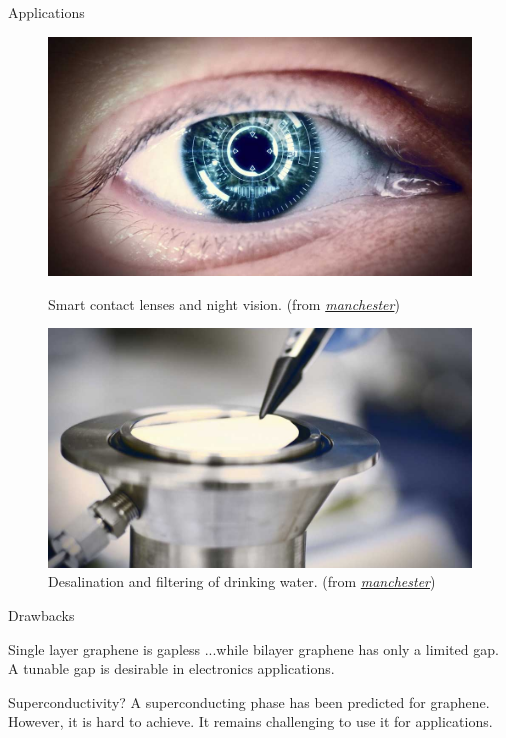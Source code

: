 \documentclass{beamer}
\begin{document}
  \begin{frame}{Applications}
  \begin{figure}
  \centering
  \includegraphics[scale = 0.138]{graphene-enhanced-contact-lense_1000x565.jpg}
  \caption{Smart contact lenses and night vision. (from 
    \href{http://www.graphene.manchester.ac.uk/}{\emph{manchester}})}
   \includegraphics[scale = 0.14]{graphene-membrane_1000x565.jpg}
  \caption{Desalination and filtering of drinking water. (from 
    \href{http://www.graphene.manchester.ac.uk/}{\emph{manchester}})}
   \end{figure}
  \end{frame}
  
  \begin{frame}{Drawbacks}
  \begin{block}{Single layer graphene is gapless}
       ...while bilayer graphene has only a limited gap. A tunable gap is desirable in electronics applications.
      \end{block}

      \begin{block}{Superconductivity?}
       	A superconducting phase has been predicted for graphene. However, it is hard to achieve. It remains challenging to use it for applications.
      \end{block}
  \end{frame}  
  
\end{document}
